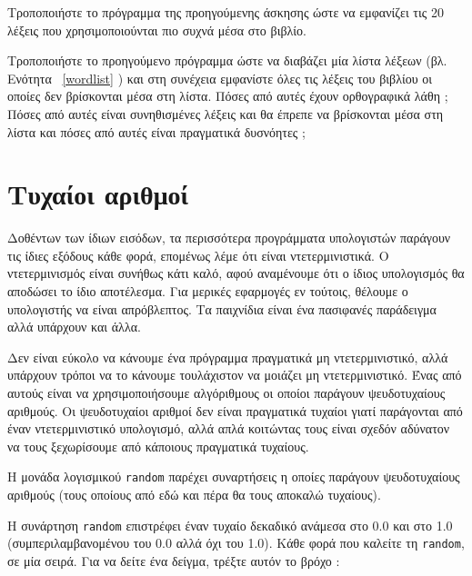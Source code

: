 \documentclass[10pt]{book}
\begin{document}
\begin{exercise}

Τροποποιήστε το πρόγραμμα της προηγούμενης άσκησης ώστε να εμφανίζει τις 20 λέξεις που χρησιμοποιούνται πιο συχνά μέσα στο βιβλίο.
\end{exercise}

\begin{exercise}

Τροποποιήστε το προηγούμενο πρόγραμμα ώστε να διαβάζει μία λίστα λέξεων (βλ. Ενότητα ~\ref{wordlist} ) και στη συνέχεια εμφανίστε όλες τις λέξεις του βιβλίου οι οποίες δεν βρίσκονται μέσα στη λίστα. Πόσες από αυτές έχουν ορθογραφικά λάθη ;  
Πόσες από αυτές είναι συνηθισμένες λέξεις και θα έπρεπε να βρίσκονται μέσα στη λίστα και πόσες από αυτές είναι πραγματικά  δυσνόητες ;
\end{exercise}

 
\section{Τυχαίοι αριθμοί}

Δοθέντων των ίδιων εισόδων, τα περισσότερα προγράμματα υπολογιστών παράγουν τις ίδιες εξόδους κάθε φορά, επομένως λέμε ότι είναι ντετερμινιστικά. Ο ντετερμινισμός είναι συνήθως κάτι καλό, αφού αναμένουμε ότι ο ίδιος υπολογισμός θα αποδώσει το ίδιο αποτέλεσμα. Για μερικές εφαρμογές εν τούτοις, θέλουμε ο υπολογιστής να είναι απρόβλεπτος. Τα παιχνίδια είναι ένα πασιφανές παράδειγμα αλλά υπάρχουν και άλλα.

Δεν είναι εύκολο να κάνουμε ένα πρόγραμμα πραγματικά μη ντετερμινιστικό, αλλά υπάρχουν τρόποι να το κάνουμε τουλάχιστον να μοιάζει μη ντετερμινιστικό. Ένας από αυτούς είναι να χρησιμοποιήσουμε αλγόριθμους οι οποίοι παράγουν ψευδοτυχαίους αριθμούς. 
Οι ψευδοτυχαίοι αριθμοί δεν είναι πραγματικά τυχαίοι γιατί παράγονται από έναν ντετερμινιστικό υπολογισμό, αλλά απλά κοιτώντας τους είναι σχεδόν αδύνατον να τους ξεχωρίσουμε από κάποιους πραγματικά τυχαίους.

Η μονάδα λογισμικού  {\tt random}  παρέχει συναρτήσεις η οποίες παράγουν ψευδοτυχαίους αριθμούς (τους οποίους από εδώ και πέρα θα τους αποκαλώ τυχαίους).

Η συνάρτηση  {\tt random}  επιστρέφει έναν τυχαίο δεκαδικό ανάμεσα στο 0.0 και στο 1.0 (συμπεριλαμβανομένου του 0.0 αλλά όχι του 1.0). Κάθε φορά που καλείτε τη  {\tt random},  σε μία σειρά. Για να δείτε ένα δείγμα, τρέξτε αυτόν το βρόχο :
\end{document}
